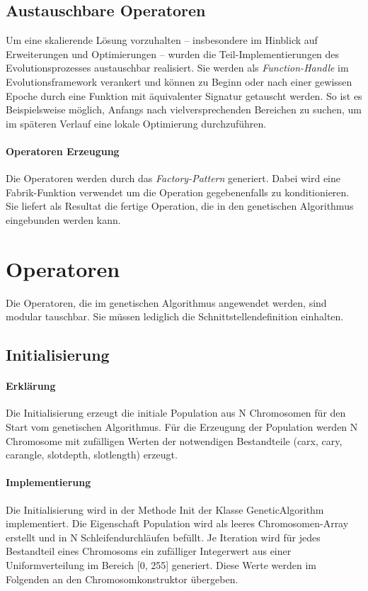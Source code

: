 \documentclass[12pt,a4paper]{scrartcl}
\begin{document}
\subsection{Austauschbare Operatoren}\label{sec:op}
Um eine skalierende Lösung vorzuhalten -- insbesondere im Hinblick auf Erweiterungen und Optimierungen -- wurden die Teil-Implementierungen des Evolutionsprozesses austauschbar realisiert. Sie werden als \emph{Function-Handle} im Evolutionsframework verankert und können zu Beginn oder nach einer gewissen Epoche durch eine Funktion mit äquivalenter Signatur getauscht werden. So ist es Beispielsweise möglich, Anfangs nach vielversprechenden Bereichen zu suchen, um im späteren Verlauf eine lokale Optimierung durchzuführen.

\paragraph{Operatoren Erzeugung} Die Operatoren werden durch das \emph{Factory-Pattern} generiert. Dabei wird eine Fabrik-Funktion verwendet um die Operation gegebenenfalls zu konditionieren. Sie liefert als Resultat die fertige Operation, die in den genetischen Algorithmus eingebunden werden kann.

\section{Operatoren}
Die Operatoren, die im genetischen Algorithmus angewendet werden, sind modular tauschbar. Sie müssen lediglich die Schnittstellendefinition einhalten.

\subsection{Initialisierung}
\paragraph{Erklärung}
Die Initialisierung erzeugt die initiale Population aus N Chromosomen für den Start vom genetischen Algorithmus. Für die Erzeugung der Population werden N Chromosome mit zufälligen Werten der notwendigen Bestandteile (carx, cary, carangle, slotdepth, slotlength) erzeugt. 

\paragraph{Implementierung}
Die Initialisierung wird in der Methode Init der Klasse GeneticAlgorithm implementiert. Die Eigenschaft Population wird als leeres Chromosomen-Array erstellt und in N Schleifendurchläufen befüllt. Je Iteration wird für jedes Bestandteil eines Chromosoms ein zufälliger Integerwert aus einer Uniformverteilung im Bereich [0, 255] generiert. Diese Werte werden im Folgenden an den Chromosomkonstruktor übergeben.
\end{document}

